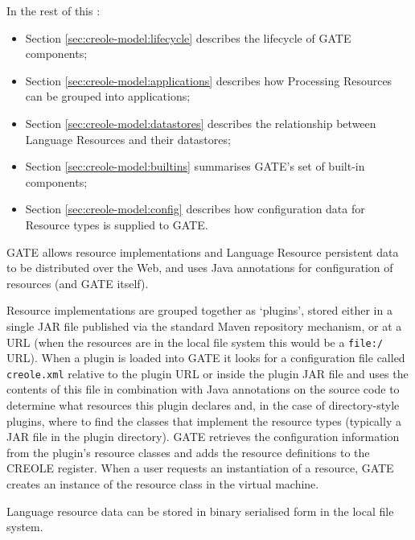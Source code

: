 In the rest of this \chapthing:
\begin{itemize}
\item
Section \ref{sec:creole-model:lifecycle} describes the lifecycle of GATE
components;
\item
Section \ref{sec:creole-model:applications} describes how Processing Resources
can be grouped into applications;
\item
Section \ref{sec:creole-model:datastores} describes the relationship between
Language Resources and their datastores;
\item
Section \ref{sec:creole-model:builtins} summarises GATE's set of built-in
components;
\item
Section \ref{sec:creole-model:config} describes how configuration data for
Resource types is supplied to GATE.
\end{itemize}



GATE allows resource implementations and Language Resource persistent data to
be distributed over the Web, and uses Java annotations for
configuration of resources (and GATE itself).

Resource implementations are grouped together as `plugins', stored
either in a single JAR file published via the standard Maven repository
mechanism, or at a URL (when the resources are in the local file system this
would be a {\tt file:/} URL). When a plugin is loaded into GATE it looks
for a configuration file called {\tt creole.xml} relative to the plugin URL or
inside the plugin JAR file and uses the contents of this file in combination
with Java annotations on the source code to determine what resources this
plugin declares and, in the case of directory-style plugins, where to find the
classes that implement the resource types (typically a JAR file in the plugin
directory).  GATE retrieves the configuration information from the plugin's
resource classes and adds the resource definitions to the CREOLE register. When
a user requests an instantiation of a resource, GATE creates an instance of the
resource class in the virtual machine.

Language resource data can be stored in binary serialised form in the local
file system.


